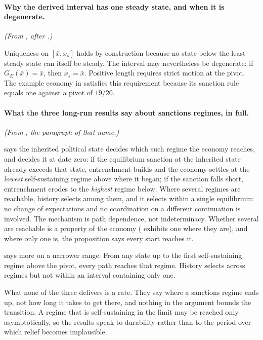 \paragraph{Why the derived interval has one steady state, and when it is degenerate.} \emph{(From , after .)}

Uniqueness on $[\bar x,x_s]$ holds by construction because no state below the
least steady state can itself be steady. The interval may nevertheless be
degenerate: if $G_E(\bar x)=\bar x$, then $x_s=\bar x$. Positive length requires
strict motion at the pivot. The example economy in
 satisfies this requirement because its sanction
rule equals one against a pivot of $19/20$.

\paragraph{What the three long-run results say about sanctions regimes, in full.} \emph{(From , the paragraph of that name.)}

 says the inherited political state decides which such
regime the economy reaches, and decides it at date zero: if the equilibrium
sanction at the inherited state already exceeds that state, entrenchment builds
and the economy settles at the \emph{lowest} self-sustaining regime above where it
began; if the sanction falls short, entrenchment erodes to the \emph{highest}
regime below. Where several regimes are reachable, history selects among them,
and it selects within a single equilibrium: no change of expectations and no
coordination on a different continuation is involved. The mechanism is path
dependence, not indeterminacy. Whether several are reachable is a property of the
economy ( exhibits one where they are),
and where only one is, the proposition says every start reaches it.

 says more on a narrower range. From any state up to
the first self-sustaining regime above the pivot, every path reaches that regime.
History selects across regimes but not within an interval containing only one.

What none of the three delivers is a rate. They say where a sanctions regime
ends up, not how long it takes to get there, and nothing in the argument bounds
the transition. A regime that is self-sustaining in the limit may be reached only
asymptotically, so the results speak to durability rather than to the period over
which relief becomes implausible.

